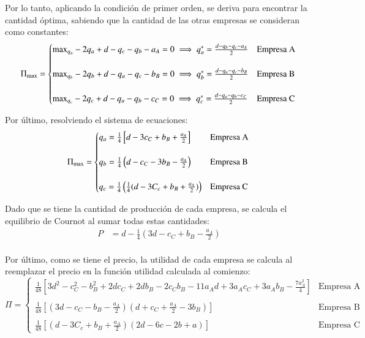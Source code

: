 \documentclass[
	spanish, %
	letterpaper, oneside
]{article}
\begin{document}
Por lo tanto, aplicando la condición de primer orden, se deriva para encontrar la cantidad óptima, sabiendo que la cantidad de las otras
empresas se consideran como constantes:\\

$$\Pi_{\text{max}}=\begin{cases}\text{max}_{q_a}-2q_a+d-q_c-q_b-a_A=0\implies q_{a}^{*}=\frac{d - q_b - q_c - a_A}{2}&\text{Empresa A}\\\\
				\text{max}_{q_b}-2q_{b}+ d-q_a-q_c - b_B = 0\implies q_{b}^{*}=\frac{d-q_a - q_c - b_B}{2}&\text{Empresa B}\\\\
				\text{max}_{q_c}-2q_{c}+ d-q_a-q_b - c_C = 0\implies q_{c}^{*}=\frac{d-q_a-q_b-c_C}{2}&\text{Empresa C}\end{cases}\\$$

Por último, resolviendo el sistema de ecuaciones: \\

$$\Pi_{\text{max}}=\begin{cases}
			   	q_a =\frac{1}{4}\left[d -3c_C + b_B + \frac{a_A}{2}\right]&\text{Empresa A}\\\\
				q_b = \frac{1}{4}\left(d-c_C - 3b_B - \frac{a_A}{2}\right)&\text{Empresa B}\\\\
				q_c =\frac{1}{4}\left( \frac{1}{4}(d - 3C_c + b_B + \frac{a_A}{2})\right)&\text{Empresa C}\end{cases}\\$$

Dado que se tiene la cantidad de producción de cada empresa, se calcula el equilibrio de Cournot al sumar todas estas cantidades:
\begin{align*}
P &= d - \frac{1}{4}(3d - c_C + b_B - \frac{a_A}{2})
\end{align*}\\

Por último, como se tiene el precio, la utilidad de cada empresa se calcula al reemplazar el precio en la función utilidad calculada al comienzo: \\

$$\Pi=\begin{cases}\frac{1}{48}\left[3d^2 - c_{C}^{2} - b_{B}^{2} + 2dc_C + 2db_B - 2c_C b_B - 11a_A d + 3a_A c_C + 3a_A b_B -\frac{7a_{A}^{2}}{4}\right]&\text{Empresa A}\\\\
				\frac{1}{48}\left[ (3d - c_C - b_B - \frac{a_A}{2})(d + c_C + \frac{a_A}{2} - 3b_B)\right]&\text{Empresa B}\\\\
				\frac{1}{48}\left[ \left( d - 3C_c + b_B + \frac{a_A}{2} \right)\left( 2d-6c-2b+a \right) \right]&\text{Empresa C}\end{cases}$$
\end{document}
